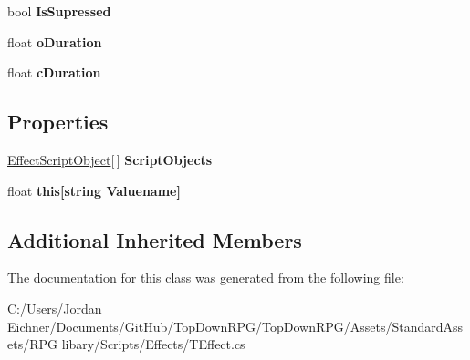 \begin{DoxyCompactItemize}
\item 
\hypertarget{class_t_effect_a7f399810b14063d6c6b0b610371716cf}{}bool {\bfseries Is\+Supressed}\label{class_t_effect_a7f399810b14063d6c6b0b610371716cf}

\item 
\hypertarget{class_t_effect_a3f8f5bc0e5f84245b3796f323d58972e}{}float {\bfseries o\+Duration}\label{class_t_effect_a3f8f5bc0e5f84245b3796f323d58972e}

\item 
\hypertarget{class_t_effect_a8c14995057021d94bf01d4821ff6534f}{}float {\bfseries c\+Duration}\label{class_t_effect_a8c14995057021d94bf01d4821ff6534f}

\end{DoxyCompactItemize}
\subsection*{Properties}
\begin{DoxyCompactItemize}
\item 
\hypertarget{class_t_effect_a5809fc4642f65d39a96e84eca3d16181}{}\hyperlink{class_effect_script_object}{Effect\+Script\+Object}\mbox{[}$\,$\mbox{]} {\bfseries Script\+Objects}\label{class_t_effect_a5809fc4642f65d39a96e84eca3d16181}

\item 
\hypertarget{class_t_effect_acf7ef62e54ec4c9703c7856a3365f95c}{}float {\bfseries this\mbox{[}string Valuename\mbox{]}}\label{class_t_effect_acf7ef62e54ec4c9703c7856a3365f95c}

\end{DoxyCompactItemize}
\subsection*{Additional Inherited Members}


The documentation for this class was generated from the following file\+:\begin{DoxyCompactItemize}
\item 
C\+:/\+Users/\+Jordan Eichner/\+Documents/\+Git\+Hub/\+Top\+Down\+R\+P\+G/\+Top\+Down\+R\+P\+G/\+Assets/\+Standard\+Assets/\+R\+P\+G libary/\+Scripts/\+Effects/T\+Effect.\+cs\end{DoxyCompactItemize}
